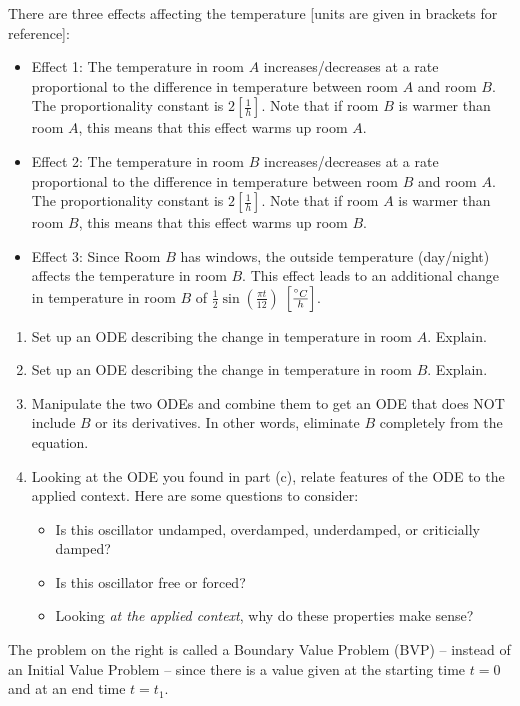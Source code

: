 \begin{enumerate}
    There are three effects affecting the temperature [units are given in brackets for reference]:
    \begin{itemize}[nosep,itemsep=2mm,topsep=2mm]
    	\item Effect 1: The temperature in room $A$ increases/decreases at a rate proportional to the difference in temperature between room $A$ and room $B$. The proportionality constant is $2\left[\frac{1}{h}\right]$. Note that if room $B$ is warmer than room $A$, this means that this effect warms up room $A$.
    	\item Effect 2: The temperature in room $B$ increases/decreases at a rate proportional to the difference in temperature between room $B$ and room $A$. The proportionality constant is $2\left[\frac{1}{h}\right]$. Note that if room $A$ is warmer than room $B$, this means that this effect warms up room $B$.
    	\item Effect 3: Since Room $B$ has windows, the outside temperature (day/night) affects the temperature in room $B$. This effect leads to an additional change in temperature in room $B$ of $\frac12\sin \left(\frac{\pi t}{12}\right)$ $\left[\frac{\degree C}{h}\right]$.
    \end{itemize}

\begin{enumerate}
	\item Set up an ODE describing the change in temperature in room $A$. Explain.
    \item Set up an ODE describing the change in temperature in room $B$. Explain.
    \item Manipulate the two ODEs and combine them to get an ODE that does NOT include $B$ or its derivatives. In other words, eliminate $B$ completely from the equation.
    \item Looking at the ODE you found in part (c), relate features of the ODE to the applied context. Here are some questions to consider:
	\begin{itemize}[nosep]
		\item Is this oscillator undamped, overdamped, underdamped, or criticially damped?
		\item Is this oscillator free or forced?
		\item Looking \textit{at the applied context}, why do these properties make sense?
	\end{itemize}
\end{enumerate}

\begin{minipage}{12cm}
\item The problem on the right is called a Boundary Value Problem (BVP) -- instead of an Initial Value Problem -- since there is a value given at the starting time $t=0$ and at an end time $t=t_1$.\medskip


\end{minipage}
\end{enumerate}
